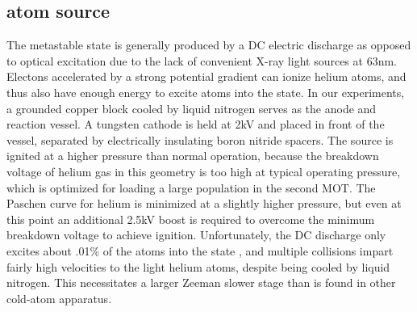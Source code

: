 
\subsection*{\mhe atom source}

	The metastable \mhe state is generally produced by a DC electric discharge as opposed to optical excitation due to the lack of convenient X-ray light sources at 63nm. Electons accelerated by a strong potential gradient can ionize helium atoms, and thus also have enough energy to excite atoms into the \mhe state. In our experiments, a grounded copper block cooled by liquid nitrogen serves as the anode and reaction vessel. A tungsten cathode is held at 2kV and placed in front of the vessel, separated by electrically insulating boron nitride spacers. The source is ignited at a higher pressure than normal operation, because the breakdown voltage of helium gas in this geometry is too high at typical operating pressure, which is optimized for loading a large population in the second MOT. The Paschen curve for helium is minimized at a slightly higher pressure, but even at this point an additional 2.5kV boost is required to overcome the minimum breakdown voltage to achieve ignition. Unfortunately, the DC discharge only excites about .01\% of the atoms into the \mhe state \cite{stas06}, and multiple collisions impart fairly high velocities to the light helium atoms, despite being cooled by liquid nitrogen. This necessitates a larger Zeeman slower stage than is found in other cold-atom apparatus. 

